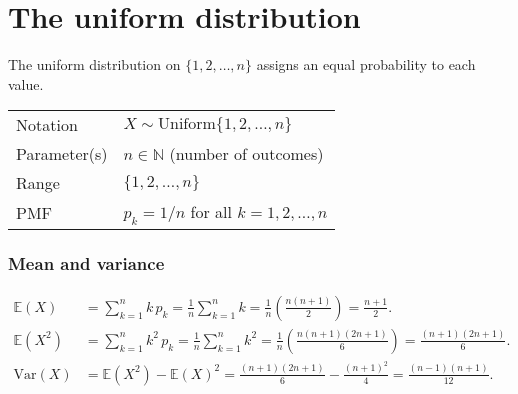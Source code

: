 \documentclass[lecture]{csm}
\newcommand{\expe}{\mathbb{E}}
\newcommand{\var}{\text{Var}}
\begin{document}
\maketitle
\tableofcontents

\section{The uniform distribution}
The uniform distribution on $\{1,2,\ldots,n\}$ assigns an equal probability to each value.
\begin{center}
\begin{tabular}{ll}\hline
Notation			& $X\sim\text{Uniform}\{1,2,\ldots,n\}$ \\
Parameter(s)		& $n\in\mathbb{N}$ \quad (number of outcomes) \\
Range			& $\{1,2,\ldots,n\}$ \\
PMF				& $p_k = 1/n$ for all $k=1,2,\ldots,n$ \\ \hline
\end{tabular}
\end{center}

\subsubsection*{Mean and variance}
\begin{align*}
\expe(X) 
	& = \sum_{k=1}^n k\,p_k
	= \frac{1}{n}\sum_{k=1}^n k 
	= \frac{1}{n}\left(\frac{n(n+1)}{2}\right)
	= \frac{n+1}{2}. \\
\expe(X^2) 
	& = \sum_{k=1}^n k^2\,p_k
	= \frac{1}{n}\sum_{k=1}^n k^2 
	= \frac{1}{n}\left(\frac{n(n+1)(2n+1)}{6}\right)
	= \frac{(n+1)(2n+1)}{6}. \\
\var(X)
	& = \expe(X^2)-\expe(X)^2  
	= \frac{(n+1)(2n+1)}{6} - \frac{(n+1)^2}{4} 
	  = \frac{(n-1)(n+1)}{12}.
\end{align*}

\break %

\end{document}
